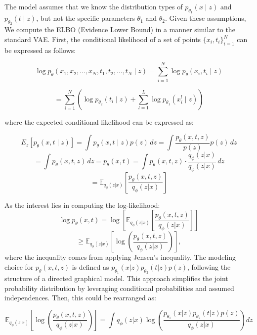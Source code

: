 \documentclass{article}
\begin{document}
The model assumes that we know the distribution types of \( p_{\theta_1} (x \mid z) \) and \( p_{\theta_2} (t \mid z) \), but not the specific parameters \( \theta_1 \) and \( \theta_2 \). Given these assumptions, 
We compute the ELBO (Evidence Lower Bound) in a manner similar to the standard VAE. First, the conditional likelihood of a set of points \(\{x_i, t_i\}_{i=1}^N\) can be expressed as follows:


\[
\log p_{\theta}(x_1, x_2, \ldots, x_N , t_1, t_2, \ldots, t_N \mid z) = \sum_{i=1}^N \log p_{\theta}(x_i, t_i \mid z)
\]

\begin{equation}
= \sum_{i=1}^N \left(\log p_{\theta_2}(t_i \mid z) + \sum_{l=1}^L \log p_{\theta_1}(x_i^l \mid z)\right) 
\end{equation}

where the expected conditional likelihood can be expressed as:

\[
E_z \left[ p_\theta (x, t \mid z) \right] = \int p_\theta (x, t \mid z) p(z) \, dz = \int \frac{p_\theta(x,t,z)}{p(z)} p(z) \, dz
\]
\begin{equation}
=\int p_\theta(x,t,z) \, dz = p_\theta(x,t) = \int p_\theta(x,t,z) \cdot \frac{q_\phi(z|x)}{q_\phi(z|x)} \, dz 
\end{equation}
\[
= \mathbb{E}_{q_\phi(z|x)} \left[ \frac{p_\theta(x,t,z)}{q_\phi(z|x)} \right]
\]

As the interest lies in computing the log-likelihood:
\begin{equation}
\log p_\theta(x, t) = \log \left[ \mathbb{E}_{q_\phi(z|x)} \left[ \frac{p_\theta(x,t,z)}{q_\phi(z|x)} \right] \right]
\end{equation}
\[
 \geq \mathbb{E}_{q_\phi(z|x)} \left[ \log \left( \frac{p_\theta(x,t,z)}{q_\phi(z|x)} \right) \right],
\]
where the inequality comes from applying Jensen’s inequality.
The modeling choice for \( p_\theta(x, t, z) \) is defined as \( p_{\theta_1}(x|z) p_{\theta_2}(t|z) p(z) \), following the structure of a directed graphical model. This approach simplifies the joint probability distribution by leveraging conditional probabilities and assumed independences. Then, this could be rearranged as:

\[
\mathbb{E}_{q_\phi(z|x)} \left[ \log \left( \frac{p_\theta(x, t, z)}{q_\phi(z|x)} \right) \right] = \int q_\phi(z|x) \log \left( \frac{p_{\theta_1}(x|z) p_{\theta_2}(t|z) p(z)}{q_\phi(z|x)} \right) dz
\]
\end{document}

